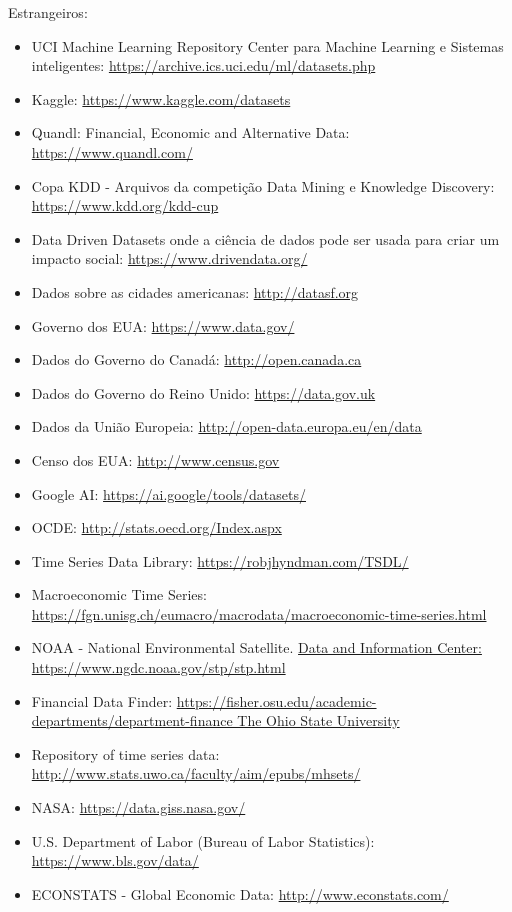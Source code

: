 \begin{frame}[allowframebreaks]
Estrangeiros:
\begin{itemize}
\item UCI Machine Learning Repository Center para Machine Learning e Sistemas inteligentes: \url{https://archive.ics.uci.edu/ml/datasets.php}
\item Kaggle: \url{https://www.kaggle.com/datasets}
\item Quandl: Financial, Economic and Alternative Data: \url{https://www.quandl.com/}
\item Copa KDD - Arquivos da competição Data Mining e Knowledge Discovery: \url{https://www.kdd.org/kdd-cup}
\item Data Driven Datasets onde a ciência de dados pode ser usada para criar um impacto social: \url{https://www.drivendata.org/}
\item Dados sobre as cidades americanas: \url{http://datasf.org}
\item Governo dos EUA: \url{https://www.data.gov/}
\item Dados do Governo do Canadá: \url{http://open.canada.ca}
\item Dados do Governo do Reino Unido: \url{https://data.gov.uk}
\item Dados da União Europeia: \url{http://open-data.europa.eu/en/data}
\item Censo dos EUA: \url{http://www.census.gov}
\item Google AI: \url{https://ai.google/tools/datasets/}
\item OCDE: \url{http://stats.oecd.org/Index.aspx}
\item Time Series Data Library: \url{https://robjhyndman.com/TSDL/}
\item Macroeconomic Time Series: \url{https://fgn.unisg.ch/eumacro/macrodata/macroeconomic-time-series.html}
\item NOAA - National Environmental Satellite. \url{Data and Information Center: https://www.ngdc.noaa.gov/stp/stp.html}
\item Financial Data Finder: \url{https://fisher.osu.edu/academic-departments/department-finance The Ohio State University}
\item Repository of time series data: \url{http://www.stats.uwo.ca/faculty/aim/epubs/mhsets/}
\item NASA: \url{https://data.giss.nasa.gov/}
\item U.S. Department of Labor (Bureau of Labor Statistics): \url{https://www.bls.gov/data/}
\item ECONSTATS - Global Economic Data: \url{http://www.econstats.com/}

\end{itemize}
\end{frame}
